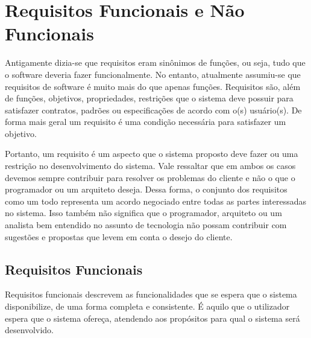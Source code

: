 \chapter[Requisitos Funcionais e Não Funcionais]{Requisitos Funcionais e Não Funcionais}
\label{chap:requisitos}
	
	Antigamente dizia-se que requisitos eram sinônimos de funções, ou seja, tudo que o software deveria fazer funcionalmente. No entanto, atualmente assumiu-se que requisitos de software é muito mais do que apenas funções. Requisitos são, além de funções, objetivos, propriedades, restrições que o sistema deve possuir para satisfazer contratos, padrões ou especificações de acordo com o(s) usuário(s). De forma mais geral um requisito é uma condição necessária para satisfazer um objetivo.

	Portanto, um requisito é um aspecto que o sistema proposto deve fazer ou uma restrição no desenvolvimento do sistema. Vale ressaltar que em ambos os casos devemos sempre contribuir para resolver os problemas do cliente e não o que o programador ou um arquiteto deseja. Dessa forma, o conjunto dos requisitos como um todo representa um acordo negociado entre todas as partes interessadas no sistema. Isso também não significa que o programador, arquiteto ou um analista bem entendido no assunto de tecnologia não possam contribuir com sugestões e propostas que levem em conta o desejo do cliente.

	\section[Requisitos Funcionais]{Requisitos Funcionais}
	\label{sec:requisitos_funcionais}

		Requisitos funcionais descrevem as funcionalidades que se espera que o sistema disponibilize, de uma forma completa e consistente. É aquilo que o utilizador espera que o sistema ofereça, atendendo aos propósitos para qual o sistema será desenvolvido.

